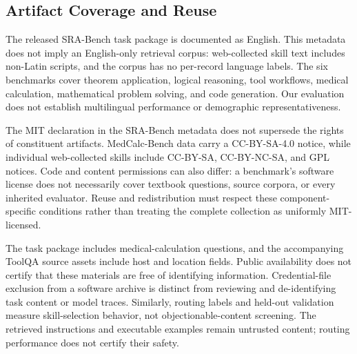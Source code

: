 \subsection{Artifact Coverage and Reuse}
\label{app:artifact-scope}
The released SRA-Bench task package is documented as English. This metadata does not imply an English-only retrieval corpus: web-collected skill text includes non-Latin scripts, and the corpus has no per-record language labels. The six benchmarks cover theorem application, logical reasoning, tool workflows, medical calculation, mathematical problem solving, and code generation. Our evaluation does not establish multilingual performance or demographic representativeness.

The MIT declaration in the SRA-Bench metadata does not supersede the rights of constituent artifacts. MedCalc-Bench data carry a CC-BY-SA-4.0 notice, while individual web-collected skills include CC-BY-SA, CC-BY-NC-SA, and GPL notices. Code and content permissions can also differ: a benchmark's software license does not necessarily cover textbook questions, source corpora, or every inherited evaluator. Reuse and redistribution must respect these component-specific conditions rather than treating the complete collection as uniformly MIT-licensed.

The task package includes medical-calculation questions, and the accompanying ToolQA source assets include host and location fields. Public availability does not certify that these materials are free of identifying information. Credential-file exclusion from a software archive is distinct from reviewing and de-identifying task content or model traces. Similarly, routing labels and held-out validation measure skill-selection behavior, not objectionable-content screening. The retrieved instructions and executable examples remain untrusted content; routing performance does not certify their safety.
